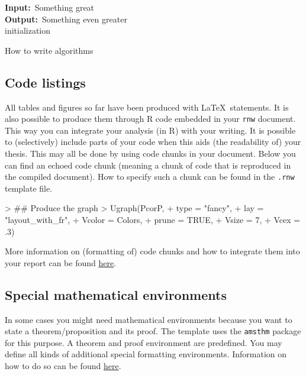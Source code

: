 \documentclass{amsart}
\theoremstyle{plain}
\renewcommand{\algorithmicrequire}{\textbf{Input:}}
\renewcommand{\algorithmicensure}{\textbf{Output:}}
\begin{document}
\begin{algorithm}[H]\label{Algo1}
\SetAlgoLined
\algorithmicrequire ~Something great \\
\algorithmicensure ~Something even greater \\
 initialization\;
 \caption{How to write algorithms}
\end{algorithm}


\subsection{Code listings}\label{Codes}
All tables and figures so far have been produced with \LaTeX \, statements.
It is also possible to produce them through R code embedded in your \texttt{rnw} document.
This way you can integrate your analysis (in \textsf{R}) with your writing.
It is possible to (selectively) include parts of your code when this aids (the readability of) your thesis.
This may all be done by using code chunks in your document.
Below you can find an echoed code chunk (meaning a chunk of code that is reproduced in the compiled document).
How to specify such a chunk can be found in the \texttt{.rnw} template file.

\begin{Schunk}
\begin{Sinput}
> ## Produce the graph
> Ugraph(PcorP,
+        type = "fancy",
+        lay = "layout_with_fr",
+        Vcolor = Colors,
+        prune = TRUE,
+        Vsize = 7,
+        Vcex = .3)
\end{Sinput}
\end{Schunk}

More information on (formatting of) code chunks and how to integrate them into your report can be found \href{https://www.chairejeanmorlet.com/uploads/1/5/4/5/15454822/stoehr.pdf}{here}.


\subsection{Special mathematical environments}\label{Maths}
In some cases you might need mathematical environments because you want to state a theorem/proposition and its proof.
The template uses the \texttt{amsthm} package for this purpose.
A theorem and proof environment are predefined.
You may define all kinds of additional special formatting environments.
Information on how to do so can be found \href{https://www.overleaf.com/learn/latex/theorems_and_proofs}{here}.
\end{document}
